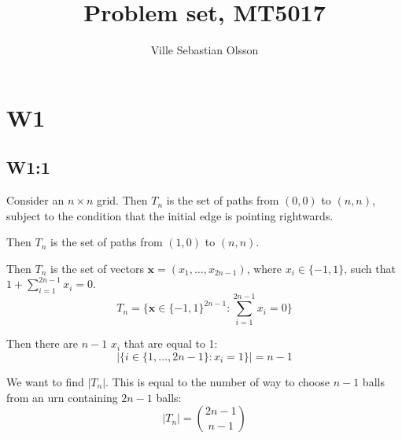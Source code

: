 \documentclass{article}
\title{Problem set, MT5017}
\author{Ville Sebastian Olsson}
\begin{document}
\maketitle
\tableofcontents

\section{W1}

\subsection{W1:1}

Consider an \(n\times n\) grid.
Then \(T_n\) is the set of paths from \((0,0)\) to \((n,n)\),
subject to the condition that the initial edge is pointing rightwards.

Then \(T_n\) is the set of paths from \((1,0)\) to \((n,n)\).

Then \(T_n\) is the set of vectors \(\mathbf{x} = (x_1,\ldots,x_{2n-1})\),
where \(x_i\in \{-1,1\}\),
such that \(1+\sum_{i=1}^{2n-1} x_i = 0\).
\[T_n = \{ \mathbf{x}\in \{-1,1\}^{2n-1}: \sum_{i=1}^{2n-1} x_i = 0\}\]

Then there are \(n-1\) \(x_i\) that are equal to 1:
\[|\{i \in \{1,\ldots,2n-1\}: x_i = 1\}| = n-1\]

We want to find \(|T_n|\). This is equal to the number of way to choose \(n-1\) balls
from an urn containing \(2n-1\) balls:
\[|T_n| = \binom{2n-1}{n-1}\]
\end{document}
